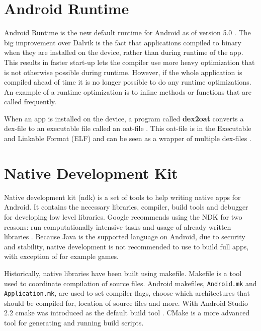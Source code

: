 
\section{Android Runtime}
Android Runtime is the new default runtime for Android as of version 5.0 \cite{android:dalvik}. The big improvement over Dalvik is the fact that applications compiled to binary when they are installed on the device, rather than during runtime of the app. This results in faster start-up \cite{li2016advanced} lets the compiler use more heavy optimization that is not otherwise possible during runtime. However, if the whole application is compiled ahead of time it is no longer possible to do any runtime optimizations. An example of a runtime optimization is to inline methods or functions that are called frequently.

When an app is installed on the device, a program called \textbf{dex2oat} converts a dex-file to an executable file called an oat-file \cite{android:art:dalvik}. This oat-file is in the Executable and Linkable Format (ELF) and can be seen as a wrapper of multiple dex-files \cite{Dresel2016}.


\section{Native Development Kit}
Native development kit (\gls{ndk}) is a set of tools to help writing native apps for Android. It contains the necessary libraries, compiler, build tools and debugger for developing low level libraries. Google recommends using the NDK for two reasons: run computationally intensive tasks and usage of already written libraries \cite{android:ndk:guides}. Because Java is the supported language on Android, due to security and stability, native development is not recommended to use to build full apps, with exception of for example games.

Historically, native libraries have been built using makefile. Makefile is a tool used to coordinate compilation of source files. Android makefiles, \texttt{Android.mk} and \texttt{Application.mk}, are used to set compiler flags, choose which architectures that should be compiled for, location of source files and more. With Android Studio 2.2 \gls{cmake} was introduced as the default build tool \cite{android:studio:cmake}. CMake is a more advanced tool for generating and running build scripts.

